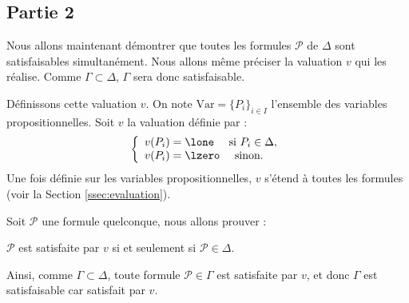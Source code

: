 \documentclass[11pt,class=report,crop=false]{standalone}
\begin{document}
\subsection{Partie 2}

Nous allons maintenant démontrer que toutes les formules $\mathcal{P}$ de $\Delta$ sont satisfaisables simultanément.
Nous allons même préciser la valuation $v$ qui les réalise.
Comme $\Gamma \subset \Delta$, $\Gamma$ sera donc satisfaisable.

Définissons cette valuation $v$.
On note $\text{Var} = \{ P_i \}_{i \in I}$ l'ensemble des variables propositionnelles.
Soit $v$ la valuation définie par :
\[
\left\lbrace 
\begin{array}{l}
	v(P_i) = \lone \quad \text{ si } P_i \in \Delta, \\
	v(P_i) = \lzero \quad \text{ sinon.}
\end{array}
\right.
\]
Une fois définie sur les variables propositionnelles, $v$ s'étend à toutes les formules (voir la Section \ref{ssec:evaluation}).

Soit $\mathcal{P}$ une formule quelconque, nous allons prouver :
\begin{lemme}
	\label{lem:Delta}
	$\mathcal{P}$ est satisfaite par $v$ si et seulement si $\mathcal{P} \in \Delta$.
\end{lemme}

Ainsi, comme $\Gamma \subset \Delta$, toute formule $\mathcal{P} \in \Gamma$ est satisfaite par $v$, et donc $\Gamma$ est satisfaisable car satisfait par $v$.
\end{document}
